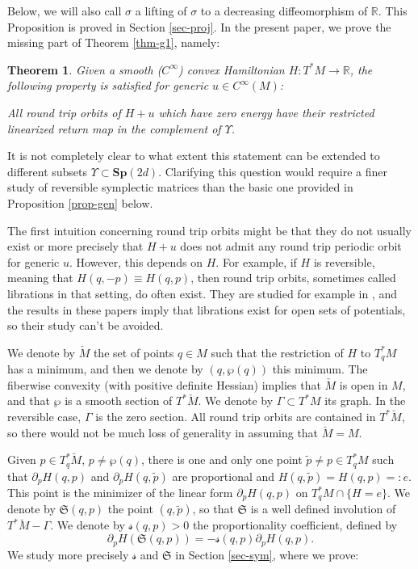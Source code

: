 \documentclass[JEP,XML,SOM,Unicode,published]{cedram}
\newcommand{\Rm}{\mathbb{R}}
\newcommand{\gS}{\ensuremath{\mathfrak{S}}}
\newcommand{\ms}{\ensuremath{\mathscr{s}}}
\newcommand{\Sp}{\mathbf{Sp}}
\theoremstyle{plain}
\newtheorem{thm}{Theorem}
\theoremstyle{definition}
\begin{document}
Below, we will also call $\sigma$ a lifting of $\sigma$ to a decreasing diffeomorphism of $\Rm$.
This Proposition is proved in Section \ref{sec-proj}.
In the present paper, we prove the missing part of Theorem \ref{thm-g1}, namely:

\begin{thm}\label{thm-g3}
Given a smooth ($C^{\infty}$) convex Hamiltonian $H: T^*M\rightarrow \Rm$,
the following property is satisfied for generic $u\in C^{\infty}(M)$:

All \emph{round trip}
orbits of $H+u$ which have zero energy have their restricted linearized
return map in the complement of $\Upsilon$.
\end{thm}

It is not completely clear to what extent this statement can be extended to different subsets $\Upsilon \subset \Sp(2d)$. Clarifying this question would require a finer study of reversible symplectic matrices than the basic one provided in Proposition \ref{prop-gen} below.

The first intuition concerning round trip orbits might be that they do not usually exist or more precisely that $H+u$ does not admit
any round trip periodic orbit for generic $u$. However, this depends on $H$. For example, if $H$ is reversible, meaning that
$H(q,-p)\equiv H(q,p)$, then round trip orbits, sometimes called librations in that setting, do often exist.
They are studied for example in \cite{BK,K76}, and the results in these papers imply that librations exist for open sets of potentials, so their study can't be avoided.

We denote by $\check M$ the set of points $q\in M$ such that the restriction of $H$ to $T^*_qM$ has a minimum,
and then we denote by $(q, \wp(q))$ this minimum. The fiberwise convexity (with positive definite Hessian) implies
that $\check M$ is open in $M$, and that $\wp$ is a smooth section of $T^*\check M$.
We denote by $\Gamma\subset T^*M$ its graph. In the reversible case, $\Gamma$ is the zero section.
All round trip orbits are contained in $T^*\breve M$, so there would not be much loss of generality in assuming that $\breve M=M$.

Given $p\in T^*_q\breve M$, $p\neq \wp(q)$, there is one and only one point
$\tilde p\neq p\in T^*_qM$ such that $\partial_pH(q,p)$ and $\partial_pH(q, \tilde p)$ are proportional and $H(q,\tilde p)=H(q,p)=:e$. This point is the minimizer of the linear form
$\partial_p H(q,p)$ on $T^*_qM\cap \{H= e\}$. We denote by $\gS(q,p)$ the point
$(q, \tilde p)$, so that $\gS$ is a well defined involution of $T^*\breve M-\Gamma$. We denote by $\ms(q,p)>0$ the proportionality coefficient, defined by
\[
\partial_pH(\gS(q,p))= -\ms(q,p)\partial_pH(q,p).
\]
We study more precisely $\ms$ and $\gS$ in Section \ref{sec-sym}, where we prove:
\end{document}
